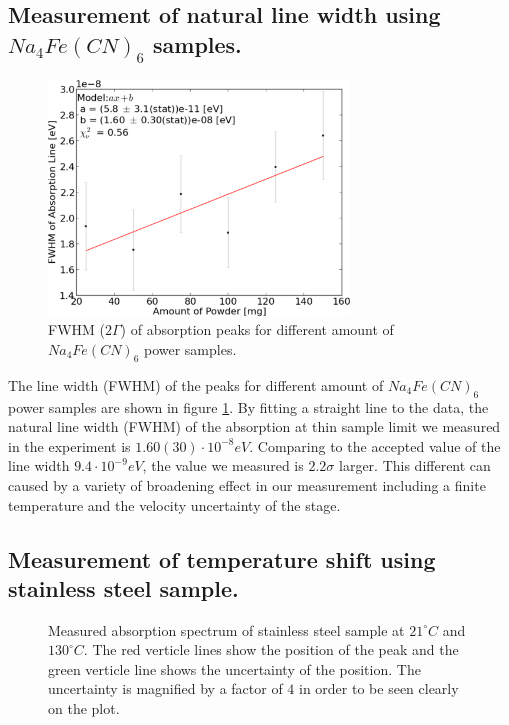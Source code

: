 \documentclass[aps,twocolumn,secnumarabic,balancelastpage,amsmath,amssymb,nofootinbib]{revtex4}
\newcommand{\dexp}[2]{\ensuremath{{#1}\cdot10^{#2}}}
\begin{document}
\subsection{Measurement of natural line width using $Na_4Fe(CN)_6$ samples.}
\begin{figure}
  \includegraphics[width=8cm]{../share/line_width.png}
  \caption{FWHM ($2\Gamma$) of absorption peaks for different amount of $Na_4Fe(CN)_6$ power samples.}
  \label{line_width}
\end{figure}
The line width (FWHM) of the peaks for different amount of $Na_4Fe(CN)_6$ power samples are shown in figure \ref{line_width}. By fitting a straight line to the data, the natural line width (FWHM) of the absorption at thin sample limit we measured in the experiment is $\dexp{1.60(30)}{-8}eV$. Comparing to the accepted value of the line width $\dexp{9.4}{-9}eV$, the value we measured is $2.2\sigma$ larger. This different can caused by a variety of broadening effect in our measurement including a finite temperature and the velocity uncertainty of the stage.

\subsection{Measurement of temperature shift using stainless steel sample.}
\begin{figure}
  \caption{Measured absorption spectrum of stainless steel sample at  $21^{\circ}C$ and  $130^{\circ}C$. The red verticle lines show the position of the peak and the green verticle line shows the uncertainty of the position. The uncertainty is magnified by a factor of $4$ in order to be seen clearly on the plot.}
  \label{temp_raw}
\end{figure}
\end{document}
